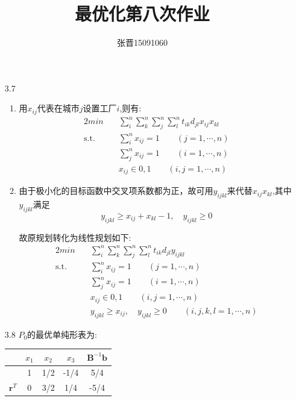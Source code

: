 \documentclass[UTF8]{ctexart}
\title{\heiti 最优化第八次作业}
\author{\kaishu 张晋15091060}
\begin{document}
\maketitle
\begin{enumerate}
\item[3.7]
\begin{enumerate}
\item 用$x_{ij}$代表在城市$j$设置工厂$i$,则有:
\begin{alignat}{2}
min \quad & \sum_i^n\sum_k^n\sum_j^n\sum_l^n t_{ik}d_{jl}x_{ij}x_{kl}  \nonumber\\
\mbox{s.t.}\quad    &\sum_i^n x_{ij}=1 \qquad(j=1,\cdots,n) 
\nonumber\\
&\sum_j^n x_{ij}=1 \qquad(i=1,\cdots,n) 
\nonumber\\
&x_{ij}\in {0,1}\qquad (i,j=1,\cdots,n) 
\end{alignat}

\item 由于极小化的目标函数中交叉项系数都为正，故可用$y_{ijkl}$来代替$x_{ij}x_{kl}$,其中$y_{ijkl}$满足
\[y_{ijkl} \geq x_{ij}+x_{kl}-1,\quad y_{ijkl} \geq 0\]

故原规划转化为线性规划如下:
\begin{alignat}{2}
min \quad & \sum_i^n\sum_k^n\sum_j^n\sum_l^n t_{ik}d_{jl}y_{ijkl}  \nonumber\\
\mbox{s.t.}\quad    &\sum_i^n x_{ij}=1 \qquad(j=1,\cdots,n) 
\nonumber\\
&\sum_j^n x_{ij}=1 \qquad(i=1,\cdots,n) 
\nonumber\\
&x_{ij}\in {0,1}\qquad (i,j=1,\cdots,n)\nonumber \\
&y_{ijkl} \geq x_{ij},\quad y_{ijkl} \geq 0\qquad(i,j,k,l=1,\cdots,n) 
\end{alignat}
\end{enumerate}

\item[3.8]$P_0$的最优单纯形表为:

\begin{table}[H]
\centering
	\begin{tabular}{ccccc}
	\toprule
	{}&$x_1$&$x_2$&$x_3$&$\bm{B}^{-1}\bm{b}$\\
	\midrule
     {}    & 1    & 1/2     & -1/4    &5/4 \\
       $\bm{r}^T$     & 0     & 3/2     & 1/4     & -5/4    \\
	\bottomrule
	\end{tabular}
\end{table}


\end{enumerate}
\end{document}
